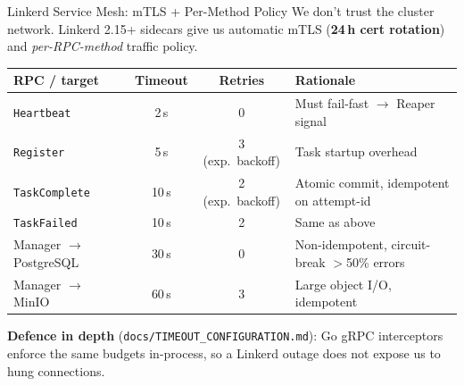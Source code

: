 \documentclass[11pt]{beamer}
\begin{document}
\begin{frame}{Linkerd Service Mesh: mTLS + Per-Method Policy}
We don't trust the cluster network. \alert{Linkerd 2.15+} sidecars give us automatic
mTLS (\textbf{24\,h cert rotation}) and \textit{per-RPC-method} traffic policy.

\vspace{0.3em}
\begin{table}
\centering
\scriptsize
\begin{tabular}{lccl}
\toprule
RPC / target              & Timeout & Retries & Rationale \\
\midrule
\texttt{Heartbeat}        & 2\,s   & \alert{0} & Must fail-fast $\to$ Reaper signal \\
\texttt{Register}         & 5\,s   & 3 (exp.\ backoff) & Task startup overhead \\
\texttt{TaskComplete}     & 10\,s  & 2 (exp.\ backoff) & Atomic commit, idempotent on attempt-id \\
\texttt{TaskFailed}       & 10\,s  & 2                & Same as above \\
Manager $\to$ PostgreSQL  & 30\,s  & \alert{0}        & Non-idempotent, circuit-break $>$50\% errors \\
Manager $\to$ MinIO       & 60\,s  & 3                & Large object I/O, idempotent \\
\bottomrule
\end{tabular}
\end{table}

\vspace{0.3em}
\scriptsize
\textbf{Defence in depth} (\texttt{docs/TIMEOUT\_CONFIGURATION.md}): Go gRPC
interceptors enforce the same budgets in-process, so a Linkerd outage
\alert{does not} expose us to hung connections.
\end{frame}
\end{document}
